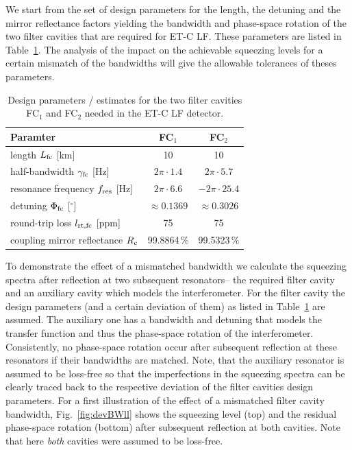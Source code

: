 We start from the set of design parameters for the length, the detuning and the mirror reflectance factors yielding the bandwidth and phase-space rotation of the two filter cavities that are required for ET-C LF. These parameters are listed  in Table~\ref{tab:designparams}. The analysis of the impact on the achievable squeezing levels for a certain mismatch of the bandwidths will give the allowable tolerances of theses parameters.
\begin{table}[h]
\begin{center}
\begin{tabular}{lcc}
\hline
\hline
Paramter & FC$_1$ & FC$_2$\\
\hline
length $L_{\rm fc}$ [km] & 10 & 10\\
half-bandwidth $\gamma_{\rm fc}$ [Hz] & $2\pi\cdot1.4$ & $2\pi\cdot5.7$\\
resonance frequency  $f_{\rm res}$ [Hz] &  $2\pi\cdot6.6$ & $-2\pi\cdot25.4$\\
detuning $\Phi_{\rm fc}$ [$^\circ$] & $\approx 0.1369$ & $\approx 0.3026$\\
round-trip loss $l_{\rm rt,fc}$  [ppm] &75  & 75\\
coupling mirror reflectance $R_{\rm c}$ & 99.8864\,\% & 99.5323\,\%\\
\hline
\hline
\end{tabular}
\end{center}
\caption{Design parameters / estimates for the two filter cavities FC$_1$ and FC$_2$ needed in the ET-C LF detector.}
\label{tab:designparams}
\end{table}


To demonstrate the effect of a mismatched bandwidth we calculate the squeezing spectra after reflection at two subsequent resonators-- the required filter cavity and an auxiliary cavity which models the interferometer. For the filter cavity the design parameters (and a certain deviation of them) as listed in Table~\ref{tab:designparams} are assumed. The auxiliary one has a bandwidth and detuning  that models the transfer function and thus the phase-space rotation of the interferometer.  Consistently,  no phase-space rotation occur after subsequent reflection at these resonators if their bandwidths are matched.   Note, that  the auxiliary resonator is assumed to be loss-free so that the imperfections in the squeezing spectra can be clearly traced back to the respective deviation of the filter cavities design parameters. For a first illustration of the effect of a mismatched filter cavity bandwidth, Fig.~\ref{fig:devBWll} shows the squeezing level (top) and the residual phase-space rotation (bottom) after subsequent  reflection at both cavities. Note that here  \emph{both} cavities  were assumed to be loss-free.



